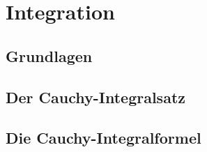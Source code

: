 \section{Integration}

\subsection{Grundlagen}

\subsection{Der Cauchy-Integralsatz}

\subsection{Die Cauchy-Integralformel}
